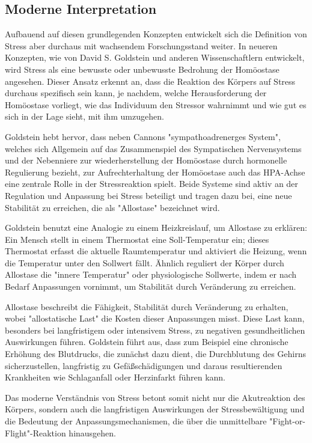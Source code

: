 \subsection{Moderne Interpretation}

Aufbauend auf diesen grundlegenden Konzepten entwickelt sich die Definition von Stress aber durchaus mit wachsendem Forschungsstand weiter. 
In neueren Konzepten, wie von David S. Goldstein und anderen Wissenschaftlern entwickelt, wird Stress als eine bewusste oder unbewusste Bedrohung der 
Homöostase angesehen. Dieser Ansatz erkennt an, dass die Reaktion des Körpers auf Stress durchaus spezifisch sein kann, je nachdem, welche Herausforderung 
der Homöostase vorliegt, wie das Individuum den Stressor wahrnimmt und wie gut es sich in der Lage sieht, mit ihm umzugehen.

Goldstein hebt hervor, dass neben Cannons "sympathoadrenerges System", welches sich Allgemein auf das Zusammenspiel des Sympatischen Nervensystems 
und der Nebenniere zur wiederherstellung der Homöostase durch hormonelle Regulierung bezieht, zur Aufrechterhaltung der Homöostase auch das \ac{HPA-Achse}
eine zentrale Rolle in der Stressreaktion spielt. Beide Systeme sind aktiv an der Regulation und Anpassung bei Stress beteiligt und tragen dazu bei, eine 
neue Stabilität zu erreichen, die als "Allostase" bezeichnet wird.

Goldstein benutzt eine Analogie zu einem Heizkreislauf, um Allostase zu erklären: Ein Mensch stellt in einem Thermostat 
eine Soll-Temperatur ein; dieses Thermostat erfasst die aktuelle Raumtemperatur und aktiviert die Heizung, wenn die Temperatur unter den Sollwert fällt. 
Ähnlich reguliert der Körper durch Allostase die "innere Temperatur" oder physiologische Sollwerte, indem er nach Bedarf Anpassungen vornimmt, 
um Stabilität durch Veränderung zu erreichen.

Allostase beschreibt die Fähigkeit, Stabilität durch Veränderung zu erhalten, wobei "allostatische Last" die Kosten dieser Anpassungen misst. 
Diese Last kann, besonders bei langfristigem oder intensivem Stress, zu negativen gesundheitlichen Auswirkungen führen. Goldstein führt aus, 
dass zum Beispiel eine chronische Erhöhung des Blutdrucks, die zunächst dazu dient, die Durchblutung des Gehirns sicherzustellen, langfristig zu 
Gefäßschädigungen und daraus resultierenden Krankheiten wie Schlaganfall oder Herzinfarkt führen kann. \cite{Gold2007}

Das moderne Verständnis von Stress betont somit nicht nur die Akutreaktion des Körpers, sondern auch die langfristigen Auswirkungen der Stressbewältigung 
und die Bedeutung der Anpassungsmechanismen, die über die unmittelbare "Fight-or-Flight"-Reaktion hinausgehen.

